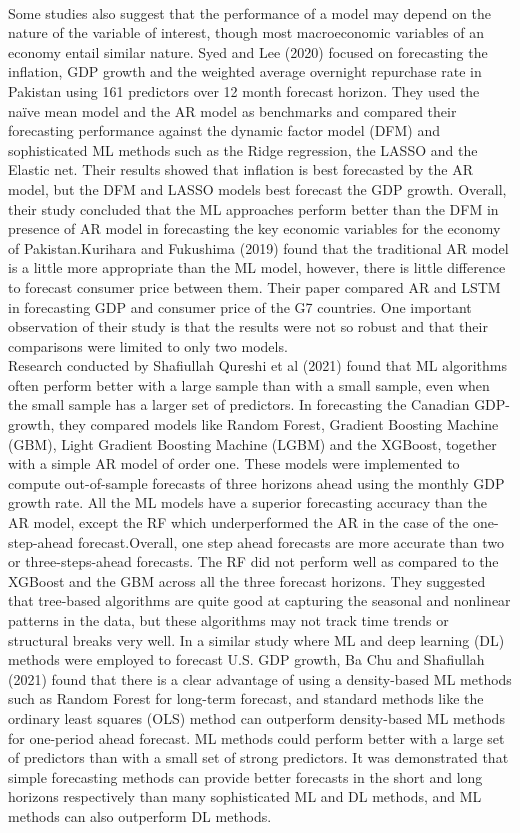 \documentclass[12pt,italian, twoside]{report}
\begin{document}
\\
Some studies also suggest that the performance of a model may depend on the nature of the variable of interest, though most macroeconomic variables of an economy entail similar nature. Syed and Lee (2020) focused on forecasting the inflation, GDP growth and the weighted average overnight repurchase rate in Pakistan using 161 predictors over 12 month forecast horizon. They used the naïve mean model and the AR model as benchmarks and compared their forecasting performance against the dynamic factor model (DFM) and sophisticated ML methods such as the Ridge regression, the LASSO and the Elastic net. Their results showed that inflation is best forecasted by the AR model, but the DFM and LASSO models best forecast the GDP growth. Overall, their study concluded that the ML approaches perform better than the DFM in presence of AR model in forecasting the key economic variables for the economy of Pakistan.Kurihara and Fukushima (2019) found that the traditional AR model is a little more appropriate than the ML model, however, there is little difference to forecast consumer price between them. Their paper compared AR and LSTM in forecasting GDP and consumer price of the G7 countries. One important observation of their study is that the results were not so robust and that their comparisons were limited to only two models.
\\
Research conducted by Shafiullah Qureshi et al (2021) found that ML algorithms often perform better with a large sample than with a small sample, even when the small sample has a larger set of predictors. In forecasting the Canadian GDP-growth, they compared models like Random Forest, Gradient Boosting Machine (GBM), Light Gradient Boosting Machine (LGBM) and the XGBoost, together with a simple AR model of order one. These models were implemented to compute out-of-sample forecasts of three horizons ahead using the monthly GDP growth rate. All the ML models have a superior forecasting accuracy than the AR model, except the RF which underperformed the AR in the case of the one-step-ahead forecast.Overall, one step ahead forecasts are more accurate than two or three-steps-ahead forecasts. The RF did not perform well as compared to the XGBoost and the GBM across all the three forecast horizons. They suggested that tree-based algorithms are quite good at capturing the seasonal and nonlinear patterns in the data, but these algorithms may not track time trends or structural breaks very well. In a similar study where ML and deep learning (DL) methods were employed to forecast U.S. GDP growth, Ba Chu and Shafiullah (2021) found that there is a clear advantage of using a density-based ML methods such as Random Forest for long-term forecast, and standard methods like the ordinary least squares (OLS) method can outperform density-based ML methods for one-period ahead forecast. ML methods could perform better with a large set of predictors than with a small set of strong predictors. It was demonstrated that simple forecasting methods can provide better forecasts in the short and long horizons respectively than many sophisticated ML and DL methods, and ML methods can also outperform DL methods. \\
\end{document}
